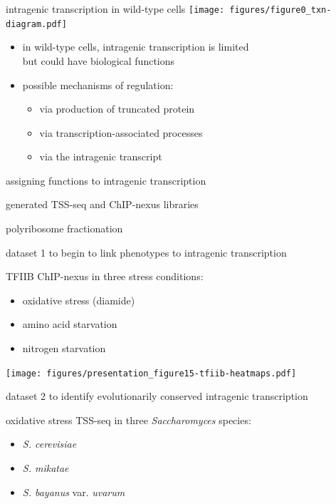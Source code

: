 \documentclass[aspectratio=169]{beamer}
\begin{document}
\begin{frame}{intragenic transcription in wild-type cells}
    \centering
    \texttt{[image: figures/figure0\_txn-diagram.pdf]}
    \begin{itemize}
        \item in wild-type cells, intragenic transcription is limited\\but could have biological functions
        \item possible mechanisms of regulation:
            \begin{itemize}
                \item via production of truncated protein
                \item via transcription-associated processes
                \item via the intragenic transcript
            \end{itemize}
    \end{itemize}
\end{frame}

\begin{frame}{assigning functions to intragenic transcription}
    \begin{description}[align=right, noitemsep]
        \item [Steve Doris] generated TSS-seq and ChIP-nexus libraries
        \item [Dan Spatt] polyribosome fractionation
    \end{description}
\end{frame}

\begin{frame}{dataset 1}
    to begin to link phenotypes to intragenic transcription
    \vspace{2em}

    TFIIB ChIP-nexus in three stress conditions:
    \begin{itemize}
        \item oxidative stress (diamide)
        \item amino acid starvation
        \item nitrogen starvation
    \end{itemize}
\end{frame}

\begin{frame}
\texttt{[image: figures/presentation\_figure15-tfiib-heatmaps.pdf]}
\end{frame}

\begin{frame}{dataset 2}
    to identify evolutionarily conserved intragenic transcription
    \vspace{2em}

    oxidative stress TSS-seq in three \textit{Saccharomyces} species:
    \begin{itemize}
        \item \textit{S. cerevisiae}
        \item \textit{S. mikatae}
        \item \textit{S. bayanus} var. \textit{uvarum}
    \end{itemize}
\end{frame}
\end{document}

